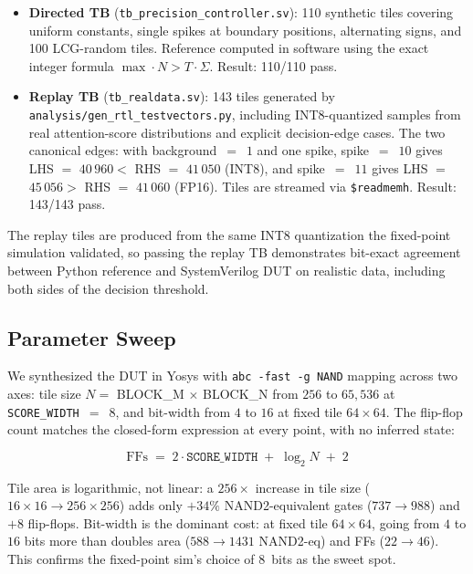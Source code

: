 \documentclass[10pt,twocolumn]{article}
\begin{document}
\begin{itemize}
  \item \textbf{Directed TB} (\texttt{tb\_precision\_controller.sv}):
    110 synthetic tiles covering uniform constants, single spikes at
    boundary positions, alternating signs, and 100 LCG-random tiles.
    Reference computed in software using the exact integer formula
    $\max\!\cdot\! N > T\!\cdot\!\Sigma$. Result: 110/110 pass.
  \item \textbf{Replay TB} (\texttt{tb\_realdata.sv}): 143 tiles
    generated by \texttt{analysis/gen\_rtl\_testvectors.py}, including
    INT8-quantized samples from real attention-score distributions and
    explicit decision-edge cases. The two canonical edges: with
    background~$=$~$1$ and one spike,
    spike~$=$~$10$ gives LHS $=$ $40\,960 < $ RHS $=$ $41\,050$
    (INT8), and spike~$=$~$11$ gives LHS $=$ $45\,056 > $ RHS $=$
    $41\,060$ (FP16). Tiles are streamed via \texttt{\$readmemh}.
    Result: 143/143 pass.
\end{itemize}

The replay tiles are produced from the same INT8 quantization the
fixed-point simulation validated, so passing the replay TB demonstrates
bit-exact agreement between Python reference and SystemVerilog DUT on
realistic data, including both sides of the decision threshold.

\subsection{Parameter Sweep}
\label{sec:rtl_sweep}

We synthesized the DUT in Yosys with \texttt{abc -fast -g NAND} mapping
across two axes: tile size $N = $ BLOCK\_M $\times$ BLOCK\_N from $256$
to $65{,}536$ at \texttt{SCORE\_WIDTH}~$=$~$8$, and bit-width from $4$
to $16$ at fixed tile $64\!\times\!64$. The flip-flop count matches the
closed-form expression at every point, with no inferred state:

\[
  \mathrm{FFs} \;=\; 2 \cdot \texttt{SCORE\_WIDTH} \;+\; \log_2 N \;+\; 2
\]

Tile area is logarithmic, not linear: a $256\times$ increase in tile
size ($16\!\times\!16 \rightarrow 256\!\times\!256$) adds only
$+34\%$ NAND2-equivalent gates ($737 \rightarrow 988$) and $+8$
flip-flops. Bit-width is the dominant cost: at fixed tile $64\!\times\!64$,
going from $4$ to $16$ bits more than doubles area
($588 \rightarrow 1431$ NAND2-eq) and FFs ($22 \rightarrow 46$).
This confirms the fixed-point sim's choice of $8$~bits as the
sweet spot.
\end{document}
